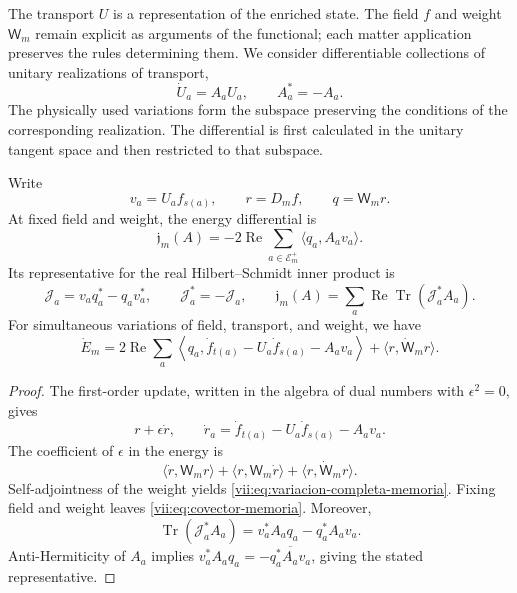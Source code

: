 The transport \(U\) is a representation of the enriched state. The field
\(f\) and weight \(\mathsf W_m\) remain explicit as arguments of
the functional; each matter application preserves the rules determining
them. We consider differentiable collections of unitary
realizations of transport,
\[
 \dot U_a=A_aU_a,\qquad A_a^*=-A_a.
\]
The physically used variations form the subspace preserving
the conditions of the corresponding realization. The differential is
first calculated in the unitary tangent space and then restricted
to that subspace.

\begin{proposition}
\label{vii:prop:covector-memoria}
Write
\[
 v_a=U_af_{s(a)},\qquad r=D_mf,\qquad q=\mathsf W_mr.
\]
At fixed field and weight, the energy differential is
\begin{equation}
 \mathfrak j_m(A)=-2\operatorname{Re}
       \sum_{a\in\mathcal E_m^+}\langle q_a,A_av_a\rangle .
 \label{vii:eq:covector-memoria}
\end{equation}
Its representative for the real Hilbert--Schmidt inner product is
\begin{equation}
 \mathcal J_a=v_aq_a^*-q_av_a^*,\qquad
 \mathcal J_a^*=-\mathcal J_a,\qquad
 \mathfrak j_m(A)=
 \sum_a\operatorname{Re}\operatorname{Tr}(\mathcal J_a^*A_a).
 \label{vii:eq:representante-corriente-discreta}
\end{equation}
For simultaneous variations of field, transport, and weight, we have
\begin{equation}
 \dot E_m=
 2\operatorname{Re}\sum_a
 \left\langle q_a,\dot f_{t(a)}-U_a\dot f_{s(a)}-A_av_a\right\rangle
 +\langle r,\dot{\mathsf W}_mr\rangle .
 \label{vii:eq:variacion-completa-memoria}
\end{equation}
\end{proposition}

\begin{proof}
The first-order update, written in the algebra of dual
numbers with \(\epsilon^2=0\), gives
\[
 r+\epsilon\dot r,\qquad
 \dot r_a=\dot f_{t(a)}-U_a\dot f_{s(a)}-A_av_a.
\]
The coefficient of \(\epsilon\) in the energy is
\[
 \langle\dot r,\mathsf W_mr\rangle+
 \langle r,\mathsf W_m\dot r\rangle+
 \langle r,\dot{\mathsf W}_mr\rangle.
\]
Self-adjointness of the weight yields
\eqref{vii:eq:variacion-completa-memoria}. Fixing field and weight leaves
\eqref{vii:eq:covector-memoria}. Moreover,
\[
 \operatorname{Tr}(\mathcal J_a^*A_a)
 =v_a^*A_aq_a-q_a^*A_av_a.
\]
Anti-Hermiticity of \(A_a\) implies
\(v_a^*A_aq_a=-\overline{q_a^*A_av_a}\), giving
the stated representative.
\end{proof}

